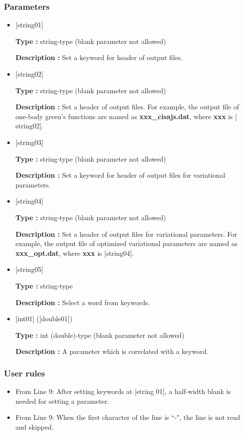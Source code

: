 \subsubsection{Parameters}
\begin{itemize}

   \item  $[$string01$]$
   
   {\bf Type :} string-type (blank parameter not allowed)

  {\bf Description :} Set a keyword for header of output files.

   
   \item  $[$string02$]$
   
   {\bf Type :} string-type (blank parameter not allowed)

  {\bf Description :} Set a header of output files. For example, the output file of one-body green's functions are named as {\bf xxx\_cisajs.dat}, where {\bf xxx} is $[$string02$]$.

\item  $[$string03$]$
   
   {\bf Type :} string-type (blank parameter not allowed)

  {\bf Description :} Set a keyword for header of output files for variational parameters.

   
   \item  $[$string04$]$
   
   {\bf Type :} string-type (blank parameter not allowed)

  {\bf Description :} Set a header of output files for variational parameters. For example, the output file of optimized variational parameters are named as {\bf xxx\_opt.dat}, where {\bf xxx} is $[$string04$]$.

   \item  $[$string05$]$
   
   {\bf Type :} string-type

  {\bf Description :} Select a word from keywords.

   \item  $[$int01$]$ ([double01])
   
   {\bf Type :} int (double)-type (blank parameter not allowed)

  {\bf Description :} A parameter which is correlated with a keyword.
  \end{itemize}

\subsubsection{User rules}
\begin{itemize}
\item From Line 9: After setting keywords at [string 01], a half-width blank is needed for setting a parameter.
\item From Line 9: When the first character of the line is ``-", the line is not read and skipped.
\end{itemize}


